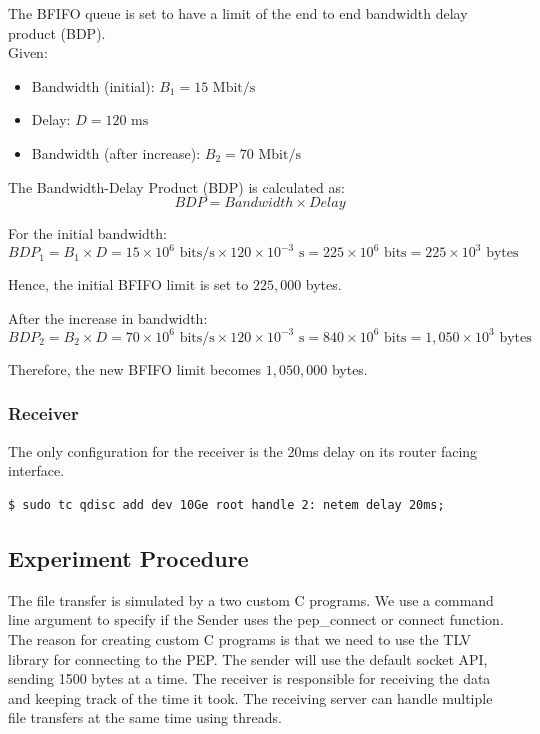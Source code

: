 \documentclass[a4paper,english, 11pt]{report}
\begin{document}
The BFIFO queue is set to have a limit of the end to end bandwidth delay product (BDP).\\
Given:
\begin{itemize}
    \item Bandwidth (initial): \( B_1 = 15 \text{ Mbit/s} \)
    \item Delay: \( D = 120 \text{ ms} \)
    \item Bandwidth (after increase): \( B_2 = 70 \text{ Mbit/s} \)
\end{itemize}

The Bandwidth-Delay Product (BDP) is calculated as:
\begin{equation}
    BDP = Bandwidth \times Delay
\end{equation}

For the initial bandwidth:
\begin{equation}
    BDP_1 = B_1 \times D = 15 \times 10^6 \text{ bits/s} \times 120 \times 10^{-3} \text{ s} = 225 \times 10^6 \text{ bits} = 225 \times 10^3 \text{ bytes}
\end{equation}

Hence, the initial BFIFO limit is set to \( 225,000 \) bytes.

After the increase in bandwidth:
\begin{equation}
    BDP_2 = B_2 \times D = 70 \times 10^6 \text{ bits/s} \times 120 \times 10^{-3} \text{ s} = 840 \times 10^6 \text{ bits} = 1,050 \times 10^3 \text{ bytes}
\end{equation}

Therefore, the new BFIFO limit becomes \( 1,050,000 \) bytes.

\subsubsection{Receiver}
The only configuration for the receiver is the 20ms delay on its router facing interface.
\begin{verbatim}
$ sudo tc qdisc add dev 10Ge root handle 2: netem delay 20ms;
\end{verbatim}


\subsection{Experiment Procedure}
The file transfer is simulated by a two custom C programs. We use a command line argument to specify if the Sender uses the pep\_connect or connect function. The reason for creating custom C programs is that we need to use the TLV library for connecting to the PEP. The sender will use the default socket API, sending 1500 bytes at a time. The receiver is responsible for receiving the data and keeping track of the time it took. The receiving server can handle multiple file transfers at the same time using threads.\\
\end{document}
